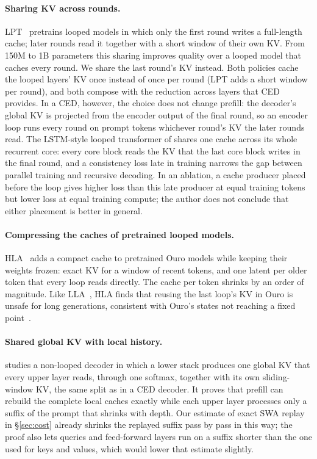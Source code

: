 \paragraph{Sharing KV across rounds.} LPT~\citep{lpt} pretrains looped models in which only the first round
writes a full-length cache; later rounds read it together with a short window of their own KV. From 150M to 1B
parameters this sharing improves quality over a looped model that caches every round. We share the last round's
KV instead. Both policies cache the looped layers' KV once instead of once per round (LPT adds a short window per
round), and both compose with the reduction across layers that CED provides. In a CED, however, the choice does
not change prefill: the decoder's global KV is projected from the encoder output of the final round, so an
encoder loop runs every round on prompt tokens whichever round's KV the later rounds read. The LSTM-style looped
transformer of \citet{lstmloop} shares one cache across its whole recurrent core: every core block reads the KV
that the last core block writes in the final round, and a consistency loss late in training narrows the gap
between parallel training and recursive decoding. In an ablation, a cache producer placed before the loop gives
higher loss than this late producer at equal training tokens but lower loss at equal training compute; the author
does not conclude that either placement is better in general.

\paragraph{Compressing the caches of pretrained looped models.} HLA~\citep{hla} adds a compact cache to pretrained
Ouro models while keeping their weights frozen: exact KV for a window of recent tokens, and one latent per older
token that every loop reads directly. The cache per token shrinks by an order of magnitude. Like
LLA~\citep{lla}, HLA finds that reusing the last loop's KV in Ouro is unsafe for long generations, consistent with
Ouro's states not reaching a fixed point~\citep{loopsright2}.

\paragraph{Shared global KV with local history.} \citet{sharedglobal_local} studies a non-looped decoder in which a
lower stack produces one global KV that every upper layer reads, through one softmax, together with its own
sliding-window KV, the same split as in a CED decoder. It proves that prefill can rebuild the complete local caches
exactly while each upper layer processes only a suffix of the prompt that shrinks with depth. Our estimate of exact
SWA replay in \S\ref{sec:cost} already shrinks the replayed suffix pass by pass in this way; the proof also lets
queries and feed-forward layers run on a suffix shorter than the one used for keys and values, which would lower
that estimate slightly.

